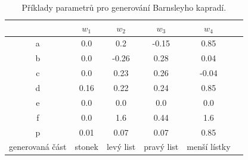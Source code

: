 \documentclass[thesis=B, czech]{FITthesis}[2019/03/06]
\begin{document}
\begin{table}[h]
   \centering%
\begin{tabular}{@{}cccccc@{}}
\toprule
\textbf{} & \textbf{$w_1$} & \textbf{$w_2$} & \textbf{$w_3$} & \textbf{$w_4$} \\ \midrule
a         & 0.0            & 0.2            & -0.15          & 0.85           \\
b         & 0.0            & -0.26          & 0.28           & 0.04           \\
c         & 0.0            & 0.23           & 0.26           & -0.04          \\
d         & 0.16           & 0.22           & 0.24           & 0.85           \\
e         & 0.0            & 0.0            & 0.0            & 0.0            \\
f         & 0.0            & 1.6            & 0.44           & 1.6            \\
p         & 0.01           & 0.07           & 0.07           & 0.85           \\ 
generovaná část         & stonek           & levý list           & pravý list           &  menší lístky           \\ \bottomrule
\end{tabular}


  \caption{\label{table:ifs}Příklady parametrů pro generování Barnsleyho kapradí.}
\end{table}
\end{document}
